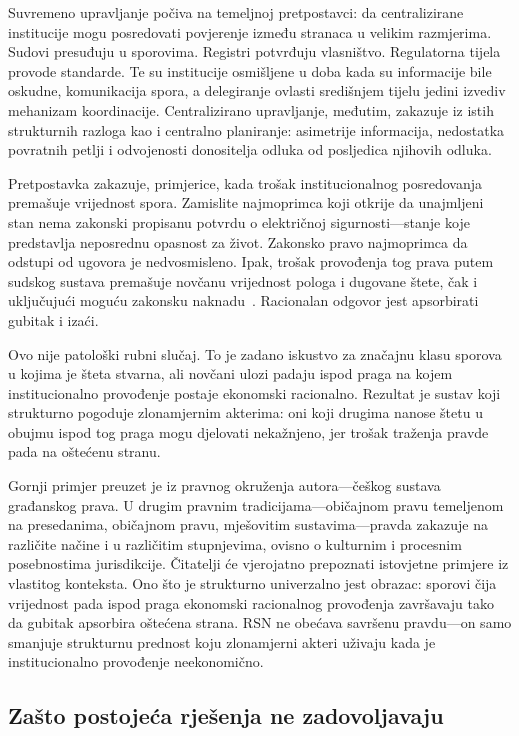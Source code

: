 \documentclass[11pt,a4paper,twocolumn]{article}
\begin{document}
Suvremeno upravljanje počiva na temeljnoj pretpostavci: da centralizirane institucije mogu posredovati povjerenje između stranaca u velikim razmjerima. Sudovi presuđuju u sporovima. Registri potvrđuju vlasništvo. Regulatorna tijela provode standarde. Te su institucije osmišljene u doba kada su informacije bile oskudne, komunikacija spora, a delegiranje ovlasti središnjem tijelu jedini izvediv mehanizam koordinacije. Centralizirano upravljanje, međutim, zakazuje iz istih strukturnih razloga kao i centralno planiranje: asimetrije informacija, nedostatka povratnih petlji i odvojenosti donositelja odluka od posljedica njihovih odluka.

Pretpostavka zakazuje, primjerice, kada trošak institucionalnog posredovanja premašuje vrijednost spora. Zamislite najmoprimca koji otkrije da unajmljeni stan nema zakonski propisanu potvrdu o električnoj sigurnosti---stanje koje predstavlja neposrednu opasnost za život. Zakonsko pravo najmoprimca da odstupi od ugovora je nedvosmisleno. Ipak, trošak provođenja tog prava putem sudskog sustava premašuje novčanu vrijednost pologa i dugovane štete, čak i uključujući moguću zakonsku naknadu~\cite{czcourtfees}. Racionalan odgovor jest apsorbirati gubitak i izaći.

Ovo nije patološki rubni slučaj. To je zadano iskustvo za značajnu klasu sporova u kojima je šteta stvarna, ali novčani ulozi padaju ispod praga na kojem institucionalno provođenje postaje ekonomski racionalno. Rezultat je sustav koji strukturno pogoduje zlonamjernim akterima: oni koji drugima nanose štetu u obujmu ispod tog praga mogu djelovati nekažnjeno, jer trošak traženja pravde pada na oštećenu stranu.

Gornji primjer preuzet je iz pravnog okruženja autora---češkog sustava građanskog prava. U drugim pravnim tradicijama---običajnom pravu temeljenom na presedanima, običajnom pravu, mješovitim sustavima---pravda zakazuje na različite načine i u različitim stupnjevima, ovisno o kulturnim i procesnim posebnostima jurisdikcije. Čitatelji će vjerojatno prepoznati istovjetne primjere iz vlastitog konteksta. Ono što je strukturno univerzalno jest obrazac: sporovi čija vrijednost pada ispod praga ekonomski racionalnog provođenja završavaju tako da gubitak apsorbira oštećena strana. RSN ne obećava savršenu pravdu---on samo smanjuje strukturnu prednost koju zlonamjerni akteri uživaju kada je institucionalno provođenje neekonomično.

\subsection{Zašto postojeća rješenja ne zadovoljavaju}
\end{document}
